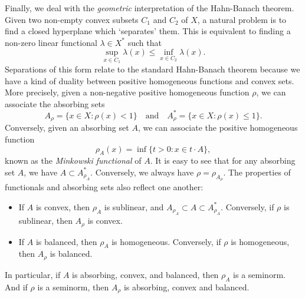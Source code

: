 Finally, we deal with the \emph{geometric} interpretation of the Hahn-Banach theorem. Given two non-empty convex subsets $C_1$ and $C_2$ of $X$, a natural problem is to find a closed hyperplane which `separates' them. This is equivalent to finding a non-zero linear functional $\lambda \in X^*$ such that
%
\[ \sup_{x \in C_1} \lambda(x) \leq \inf_{x \in C_2} \lambda(x). \]
%
Separations of this form relate to the standard Hahn-Banach theorem because we have a kind of duality between positive homogeneous functions and convex sets. More precisely, given a non-negative positive homogeneous function $\rho$, we can associate the absorbing sets
%
\[ A_\rho = \{ x \in X: \rho(x) < 1 \} \quad \text{and} \quad A_\rho^* = \{ x \in X: \rho(x) \leq 1 \}. \]
%
Conversely, given an absorbing set $A$, we can associate the positive homogeneous function
%
\[ \rho_A(x) = \inf \{ t > 0 : x \in t \cdot A \}, \]
%
known as the \emph{Minkowski functional} of $A$. It is easy to see that for any absorbing set $A$, we have $A \subset A_{\rho_A}^*$. Conversely, we always have $\rho = \rho_{A_\rho}$. The properties of functionals and absorbing sets also reflect one another:
%
\begin{itemize}
    \item If $A$ is convex, then $\rho_A$ is sublinear, and $A_{\rho_A} \subset A \subset A_{\rho_A}^*$. Conversely, if $\rho$ is sublinear, then $A_\rho$ is convex.
    \item If $A$ is balanced, then $\rho_A$ is homogeneous. Conversely, if $\rho$ is homogeneous, then $A_\rho$ is balanced.
\end{itemize}
%
In particular, if $A$ is absorbing, convex, and balanced, then $\rho_A$ is a seminorm. And if $\rho$ is a seminorm, then $A_\rho$ is absorbing, convex and balanced.

